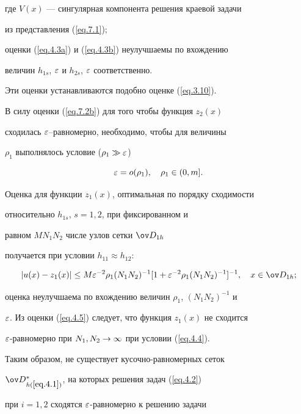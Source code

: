 где $V(x)$ --- сингулярная компонента решения краевой задачи


из представления (\ref{eq.7.1});


оценки (\ref{eq.4.3a}) и (\ref{eq.4.3b}) неулучшаемы по вхождению


величин $h_{1s}$, $\varepsilon$ и $h_{2s}$, $\varepsilon$ соответственно.


Эти оценки устанавливаются подобно оценке (\ref{eq.3.10}).





В силу оценки (\ref{eq.7.2b}) для того чтобы функция $z_2(x)$


сходилась $\varepsilon$--равномерно, необходимо, чтобы для величины


$\rho_1$ выполнялось условие ($\rho_1\gg \varepsilon$)


\begin{equation}\label{eq.4.4}


\eps=o(\rho_1), \quad \rho_1 \in (0,m].


\end{equation}


Оценка для функции $z_1(x)$, оптимальная по порядку сходимости


относительно $h_{1s}$, $s=1,2$, при фиксированном и


равном $MN_1N_2$ числе узлов сетки $\od_{1h}$


получается при условии $h_{11}\approx h_{12}$:


\begin{equation}\label{eq.4.5}


|u(x)-z_1(x)|\leq M\eps^{-2}\rho_1(N_1N_2)^{-1}


[1+\eps^{-2}\rho_1(N_1N_2)^{-1}]^{-1},\quad x\in \od_{1h};


\end{equation}


оценка неулучшаема по вхождению величин $\rho_1$, $(N_1N_2)^{-1}$ и


$\varepsilon$. Из оценки (\ref{eq.4.5}) следует, что функция $z_1(x)$ не сходится


$\varepsilon$-равномерно при $N_1,N_2\rightarrow\infty$ при условии (\ref{eq.4.4}).





Таким образом, не существует кусочно-равномерных сеток


$\od{}_{h(\ref{eq.4.1})}^*$, на которых решения задач (\ref{eq.4.2})


при $i=1,2$ сходятся $\varepsilon$-равномерно к решению задачи


